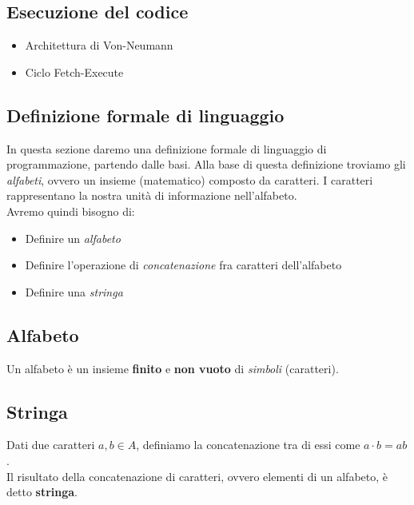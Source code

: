 \documentclass{article}
\begin{document}
\subsection*{Esecuzione del codice}
\begin{itemize}
  \item Architettura di Von-Neumann
  \item Ciclo Fetch-Execute
\end{itemize}
\pagebreak

\subsection{Definizione formale di linguaggio}
In questa sezione daremo una definizione formale di linguaggio di programmazione, partendo dalle basi. Alla base di questa definizione troviamo gli \emph{alfabeti}, ovvero un insieme (matematico) composto da caratteri. I caratteri rappresentano la nostra unità di informazione nell'alfabeto. \\
Avremo quindi bisogno di:
\begin{itemize}
  \item Definire un \emph{alfabeto}
  \item Definire l'operazione di \emph{concatenazione} fra caratteri dell'alfabeto
  \item Definire una \emph{stringa}
\end{itemize}
\subsection*{Alfabeto}
Un alfabeto è un insieme \textbf{finito} e \textbf{non vuoto} di \emph{simboli} (caratteri).
\subsection*{Stringa}
Dati due caratteri \(a, b \in A\), definiamo la concatenazione tra di essi come \(a \cdot b = ab\). \\
Il risultato della concatenazione di caratteri, ovvero elementi di un alfabeto, è detto \textbf{stringa}.
\end{document}
